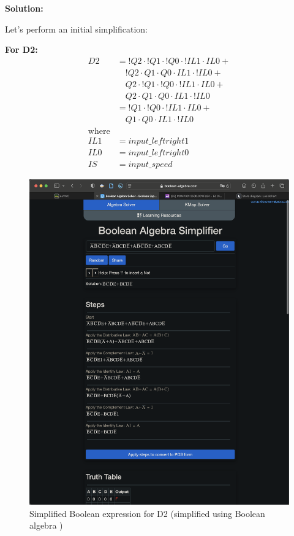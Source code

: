 \textbf{Solution:}

\noindent
Let's perform an initial simplification:

\begin{multicols}{2}
\textbf{For D2:}
\begin{align*}
    D2 &= !Q2 \cdot !Q1 \cdot !Q0 \cdot !IL1 \cdot IL0 + \\
       &\quad !Q2 \cdot Q1 \cdot Q0 \cdot IL1 \cdot !IL0 + \\
       &\quad Q2 \cdot !Q1 \cdot !Q0 \cdot !IL1 \cdot IL0 + \\
       &\quad Q2 \cdot Q1 \cdot Q0 \cdot IL1 \cdot !IL0 \\
    &= !Q1 \cdot !Q0 \cdot !IL1 \cdot IL0 + \\
    &\quad Q1 \cdot Q0 \cdot IL1 \cdot !IL0 \\
    \text{where} \\
    IL1 &= input\_leftright1 \\
    IL0 &= input\_leftright0 \\
    IS &= input\_speed
\end{align*}
\columnbreak
\begin{figure}[H]
    \centering
    \includegraphics[width=0.66\linewidth]{figures/D0simp.png}
    \caption{Simplified Boolean expression for D2 (simplified using Boolean algebra \cite{boolean-algebra})}
\end{figure}
\end{multicols}

